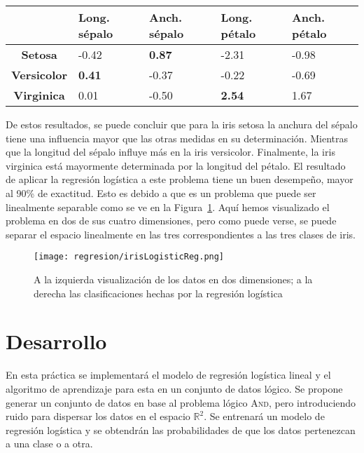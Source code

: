 \begin{center}
        \begin{tabular}{ c | l l l l }
          ~ & \textbf{Long. sépalo} & \textbf{Anch. sépalo} & \textbf{Long. pétalo} & \textbf{Anch. pétalo}\\ \hline
          \textbf{Setosa} & -0.42 & \textbf{0.87} & -2.31 & -0.98 \\
	\textbf{Versicolor} & \textbf{0.41} & -0.37 & -0.22 & -0.69 \\
	\textbf{Virginica}  & 0.01 & -0.50 & \textbf{2.54} & 1.67 \\ \hline
        \end{tabular}
    \end{center}

De estos resultados, se puede concluir que para la iris setosa la anchura del sépalo tiene una influencia mayor que las otras medidas en su determinación. Mientras que la longitud del sépalo influye más en la iris versicolor. Finalmente, la iris virginica está mayormente determinada por la longitud del pétalo. El resultado de aplicar la regresión logística a este problema tiene un buen desempeño, mayor al 90\% de exactitud. Esto es debido a que es un problema que puede ser linealmente separable como se ve en la Figura~\ref{Fig:irisLogisticReg}. Aquí hemos visualizado el problema en dos de sus cuatro dimensiones, pero como puede verse, se puede separar el espacio linealmente en las tres correspondientes a las tres clases de iris.

\begin{figure}
 \centering
 \texttt{[image: regresion/irisLogisticReg.png]}
 \caption{A la izquierda visualización de los datos en dos dimensiones; a la derecha las clasificaciones hechas por la regresión logística}\label{Fig:irisLogisticReg}
\end{figure} 




\section{Desarrollo}

En esta práctica se implementará el modelo de regresión logística lineal y el algoritmo de aprendizaje para esta en un conjunto de datos lógico. Se propone generar un conjunto de datos en base al problema lógico \textsc{And}, pero introduciendo ruido para dispersar los datos en el espacio $\mathbb{R}^2$. Se entrenará un modelo de regresión logística y se obtendrán las probabilidades de que los datos pertenezcan a una clase o a otra.



